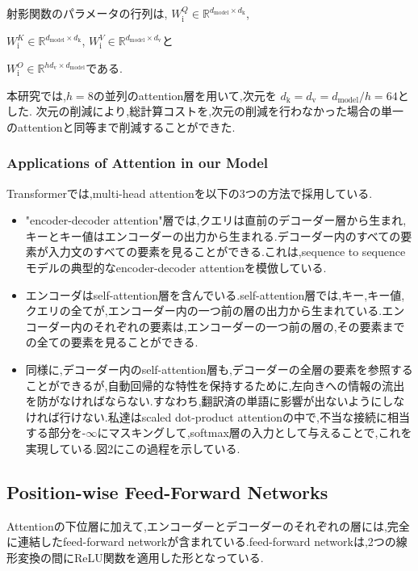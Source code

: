 \documentclass{jarticle}     %
\begin{document}
射影関数のパラメータの行列は,
$W_\mathrm{i}^Q \in \mathbb{R} ^ {{d_\mathrm{model}} \times {d_\mathrm{k}}}$,\par
$W_\mathrm{i}^K \in \mathbb{R} ^ {{d_\mathrm{model}} \times {d_\mathrm{k}}}$,
$W_\mathrm{i}^V \in \mathbb{R} ^ {{d_\mathrm{model}} \times {d_\mathrm{v}}}$と\par
$W_\mathrm{i}^O \in \mathbb{R} ^ {{hd_\mathrm{v}} \times {d_\mathrm{model}}}$である.

本研究では,$h=8$の並列のattention層を用いて,次元を
$d_\mathrm{k} = d_\mathrm{v} = d_\mathrm{model}/h = 64$とした.
次元の削減により,総計算コストを,次元の削減を行わなかった場合の単一のattentionと同等まで削減することができた.

\subsubsection{Applications of Attention in our Model}
Transformerでは,multi-head attentionを以下の3つの方法で採用している.
\begin{itemize}
  \item "encoder-decoder attention"層では,クエリは直前のデコーダー層から生まれ,キーとキー値はエンコーダーの出力から生まれる.デコーダー内のすべての要素が入力文のすべての要素を見ることができる.これは,sequence to sequenceモデルの典型的なencoder-decoder attentionを模倣している.
  \item エンコーダはself-attention層を含んでいる.self-attention層では,キー,キー値,クエリの全てが,エンコーダー内の一つ前の層の出力から生まれている.エンコーダー内のそれぞれの要素は,エンコーダーの一つ前の層の,その要素までの全ての要素を見ることができる.
  \item 同様に,デコーダー内のself-attention層も,デコーダーの全層の要素を参照することができるが,自動回帰的な特性を保持するために,左向きへの情報の流出を防がなければならない.すなわち,翻訳済の単語に影響が出ないようにしなければ行けない.私達はscaled dot-product attentionの中で,不当な接続に相当する部分を-$\infty$にマスキングして,softmax層の入力として与えることで,これを実現している.図2にこの過程を示している.
\end{itemize}

\subsection{Position-wise Feed-Forward Networks}
Attentionの下位層に加えて,エンコーダーとデコーダーのそれぞれの層には,完全に連結したfeed-forward networkが含まれている.feed-forward networkは,2つの線形変換の間にReLU関数を適用した形となっている.
\end{document}
